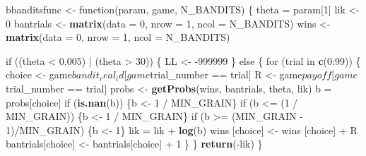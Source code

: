 \documentclass[11pt,,]{article}
\newenvironment{Shaded}{\begin{snugshade}}{\end{snugshade}}
\newcommand{\KeywordTok}[1]{\textcolor[rgb]{0.13,0.29,0.53}{\textbf{{#1}}}}
\newcommand{\DataTypeTok}[1]{\textcolor[rgb]{0.13,0.29,0.53}{{#1}}}
\newcommand{\DecValTok}[1]{\textcolor[rgb]{0.00,0.00,0.81}{{#1}}}
\newcommand{\FloatTok}[1]{\textcolor[rgb]{0.00,0.00,0.81}{{#1}}}
\newcommand{\StringTok}[1]{\textcolor[rgb]{0.31,0.60,0.02}{{#1}}}
\newcommand{\NormalTok}[1]{{#1}}
\begin{document}
\begin{Shaded}
\begin{Highlighting}[]
\NormalTok{bbanditsfunc <-}\StringTok{ }\NormalTok{function(param, game, N_BANDITS) \{}
    \NormalTok{theta =}\StringTok{ }\NormalTok{param[}\DecValTok{1}\NormalTok{]}
    \NormalTok{lik <-}\StringTok{ }\DecValTok{0} 
    \NormalTok{bantrials <-}\StringTok{ }\KeywordTok{matrix}\NormalTok{(}\DataTypeTok{data =} \DecValTok{0}\NormalTok{, }\DataTypeTok{nrow =} \DecValTok{1}\NormalTok{, }\DataTypeTok{ncol =} \NormalTok{N_BANDITS) }
    \NormalTok{wins      <-}\StringTok{ }\KeywordTok{matrix}\NormalTok{(}\DataTypeTok{data =} \DecValTok{0}\NormalTok{, }\DataTypeTok{nrow =} \DecValTok{1}\NormalTok{, }\DataTypeTok{ncol =} \NormalTok{N_BANDITS) }
    
    \NormalTok{if ((theta <}\StringTok{ }\FloatTok{0.005}\NormalTok{) |}\StringTok{ }\NormalTok{(theta >}\StringTok{ }\DecValTok{30}\NormalTok{)) \{}
        \NormalTok{LL <-}\StringTok{ }\NormalTok{-}\DecValTok{999999}   
    \NormalTok{\} }
    \NormalTok{else \{}
        \NormalTok{for (trial in }\KeywordTok{c}\NormalTok{(}\DecValTok{0}\NormalTok{:}\DecValTok{99}\NormalTok{)) \{}
            \NormalTok{choice <-}\StringTok{ }\NormalTok{game$bandit_real_id[game$trial_number ==}\StringTok{ }\NormalTok{trial]}
            \NormalTok{R      <-}\StringTok{ }\NormalTok{game$payoff        [game$trial_number ==}\StringTok{ }\NormalTok{trial]}
            \NormalTok{probs <-}\StringTok{ }\KeywordTok{getProbs}\NormalTok{(wins, bantrials, theta, lik)}
            \NormalTok{b =}\StringTok{ }\NormalTok{probs[choice]}
            \NormalTok{if (}\KeywordTok{is.nan}\NormalTok{(b))                      \{b <-}\StringTok{ }\DecValTok{1} \NormalTok{/}\StringTok{ }\NormalTok{MIN_GRAIN\}}
            \NormalTok{if (b <=}\StringTok{ }\NormalTok{(}\DecValTok{1} \NormalTok{/}\StringTok{ }\NormalTok{MIN_GRAIN))           \{b <-}\StringTok{ }\DecValTok{1} \NormalTok{/}\StringTok{ }\NormalTok{MIN_GRAIN\}}
            \NormalTok{if (b >=}\StringTok{ }\NormalTok{(MIN_GRAIN -}\StringTok{ }\DecValTok{1}\NormalTok{)/MIN_GRAIN) \{b <-}\StringTok{ }\DecValTok{1}\NormalTok{\}}
            \NormalTok{lik =}\StringTok{ }\NormalTok{lik +}\StringTok{ }\KeywordTok{log}\NormalTok{(b)}
            \NormalTok{wins     [choice] <-}\StringTok{ }\NormalTok{wins     [choice] +}\StringTok{ }\NormalTok{R}
            \NormalTok{bantrials[choice] <-}\StringTok{ }\NormalTok{bantrials[choice] +}\StringTok{ }\DecValTok{1}
        \NormalTok{\}}
    \NormalTok{\}}
    \KeywordTok{return}\NormalTok{(-lik)}
\NormalTok{\}}
\end{Highlighting}
\end{Shaded}
\end{document}

